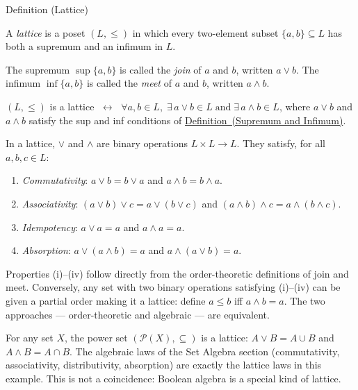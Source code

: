 
\begin{definitionbox}{Definition (Lattice)}
\begin{definition}[Lattice]\label{def:lattice}
A \emph{lattice} is a poset $(L, \leq)$ in which every two-element subset
$\{a, b\} \subseteq L$ has both a supremum and an infimum in $L$.

The supremum $\sup\{a,b\}$ is called the \emph{join} of $a$ and $b$,
written $a \vee b$.
The infimum $\inf\{a,b\}$ is called the \emph{meet} of $a$ and $b$,
written $a \wedge b$.
\end{definition}
\end{definitionbox}\begin{remark*}
$(L, \leq)$ is a lattice $\;\leftrightarrow\;$
$\forall a, b \in L,\;\exists\, a \vee b \in L \;\text{and}\; \exists\, a \wedge b \in L$,
where $a \vee b$ and $a \wedge b$ satisfy the sup and inf conditions of
\hyperref[def:sup-inf]{Definition~(Supremum and Infimum)}.
\end{remark*}

\begin{remark*}
\label{rem:lattice-operations}
In a lattice, $\vee$ and $\wedge$ are binary operations $L \times L \to L$.
They satisfy, for all $a, b, c \in L$:
\begin{enumerate}[label=(\roman*)]
  \item \emph{Commutativity}: $a \vee b = b \vee a$ and $a \wedge b = b \wedge a$.
  \item \emph{Associativity}: $(a \vee b) \vee c = a \vee (b \vee c)$ and
        $(a \wedge b) \wedge c = a \wedge (b \wedge c)$.
  \item \emph{Idempotency}: $a \vee a = a$ and $a \wedge a = a$.
  \item \emph{Absorption}: $a \vee (a \wedge b) = a$ and
        $a \wedge (a \vee b) = a$.
\end{enumerate}
Properties (i)--(iv) follow directly from the order-theoretic definitions of join
and meet.  Conversely, any set with two binary operations satisfying (i)--(iv)
can be given a partial order making it a lattice: define $a \leq b$ iff
$a \wedge b = a$.  The two approaches — order-theoretic and algebraic — are
equivalent.
\end{remark*}

\begin{example*}
\label{ex:power-set-lattice}
For any set $X$, the power set $(\mathcal{P}(X), \subseteq)$ is a lattice:
$A \vee B = A \cup B$ and $A \wedge B = A \cap B$.  The algebraic laws
of the Set Algebra section (commutativity, associativity, distributivity,
absorption) are exactly the lattice laws in this example.  This is not a
coincidence: Boolean algebra is a special kind of lattice.
\end{example*}

